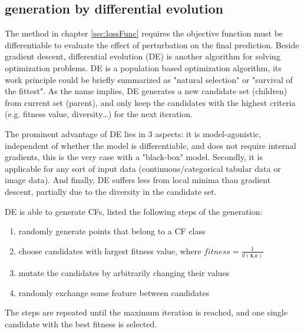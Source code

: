 \subsection{generation by differential evolution}
The method in chapter \ref{sec:lossFunc} requires the objective function must be differentiable to evaluate the effect of perturbation on the final prediction. Beside gradient descent, differential evolution (DE) is another algorithm for solving optimization problems. DE is a population based optimization algorithm, its work principle could be briefly summarized as "natural selection" or "survival of the fittest". As the name implies, DE generates a new candidate set (children) from current set (parent), and only keep the candidates with the highest criteria (e.g. fitness value, diversity\dots) for the next iteration. 

The prominent advantage of DE lies in 3 aspects: it is model-agonistic, independent of whether the model is differentiable, and does not require internal gradients, this is the very case with a "black-box" model. Secondly, it is applicable for any sort of input data (continuous/categorical tabular data or image data). And finally, DE suffers less from local minima than gradient descent, partially due to the diversity in the candidate set.

DE is able to generate CFs, \cite{certifai} listed the following steps of the generation:
\begin{enumerate}
  \item randomly generate points that belong to a CF class
  \item choose candidates with largest fitness value, where $fitness=\frac{1}{d(\textbf{x,c})}$
  \item mutate the candidates by arbitrarily changing their values
  \item randomly exchange some feature between candidates
\end{enumerate}
The steps are repeated until the maximum iteration is reached, and one single candidate with the best fitness is selected.

